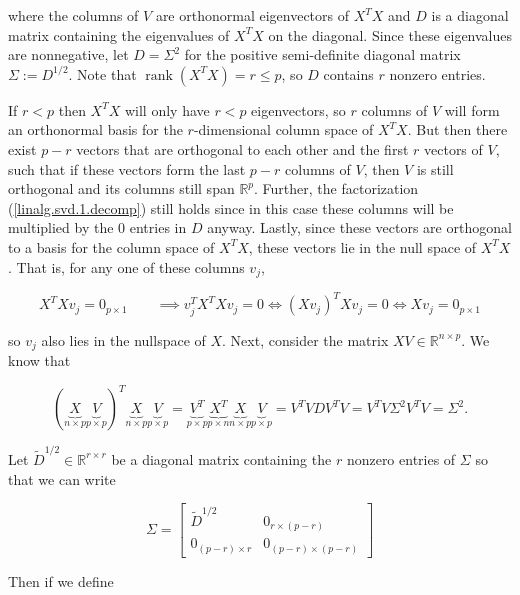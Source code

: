 where the columns of \(V\) are orthonormal eigenvectors of \(X^TX\) and \(D\) is a diagonal matrix containing the eigenvalues of \(X^TX\) on the diagonal. Since these eigenvalues are nonnegative, let \(D = \Sigma^2\) for the positive semi-definite diagonal matrix \(\Sigma := D^{1/2}\). Note that \(\operatorname{rank}(X^TX) = r \leq p\), so \(D\) contains \( r\) nonzero entries. 

If \(r < p\) then \(X^TX\) will only have \(r < p\) eigenvectors, so \(r\) columns of \(V\) will form an orthonormal basis for the \(r\)-dimensional column space of \(X^TX\). But then there exist \(p - r\) vectors that are orthogonal to each other and the first \(r\) vectors of \(V\), such that if these vectors form the last \(p-r\) columns of \(V\), then \(V\) is still orthogonal and its columns still span \(\mathbb{R}^p\). Further, the factorization (\ref{linalg.svd.1.decomp}) still holds since in this case these columns will be multiplied by the 0 entries in \(D\) anyway. Lastly, since these vectors are orthogonal to a basis for the column space of \(X^TX\), these vectors lie in the null space of \(X^TX\). That is, for any one of these columns \(v_j\),

\[
X^TX v_j = 0_{p \times 1} \qquad \implies v_j^T X^T X v_j = 0  \iff (X v_j )^T Xv _j = 0 \iff Xv _j  = 0_{p \times 1} 
\]

so \(v_j\) also lies in the nullspace of \(X\). Next, consider the matrix \(XV \in \mathbb{R}^{n \times p}\). We know that

\begin{equation}\label{linalg.svd.2.decomp}
(\underbrace{X}_{n \times p} \underbrace{V}_{p \times p})^T \underbrace{X}_{n \times p} \underbrace{V}_{p \times p} = \underbrace{V^T}_{p \times p} \underbrace{X^T}_{p \times n}  \underbrace{X}_{n \times p} \underbrace{V}_{p \times p}= V^TV D V^TV =  V^T V \Sigma^2 V^TV = \Sigma^2.
\end{equation}

Let \(\tilde{D}^{1/2} \in \mathbb{R}^{r \times r} \) be a diagonal matrix containing the \(r\) nonzero entries of \(\Sigma\) so that we can write

\[
\Sigma = \begin{bmatrix} 
\tilde{D}^{1/2} & 0_{r \times (p - r)} \\
0_{(p-r) \times r}  & 0_{(p-r) \times (p-r)}
\end{bmatrix}
\]

Then if we define

